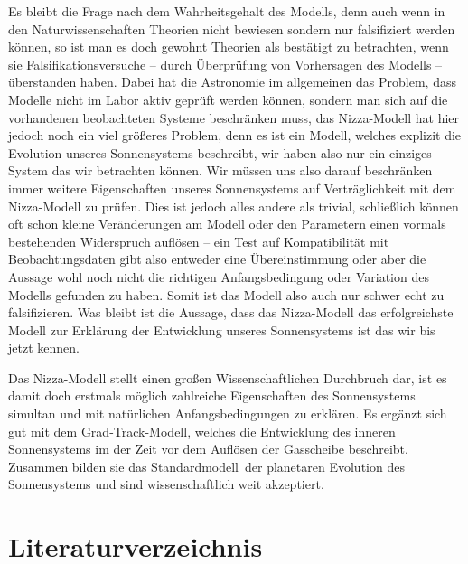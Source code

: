 \documentclass[12pt,a4paper,twoside]{article}
\renewcommand{\cite}{\citep}
\begin{document}
Es bleibt die Frage nach dem Wahrheitsgehalt des Modells, denn auch wenn in den Naturwissenschaften Theorien nicht bewiesen sondern nur falsifiziert werden können, so ist man es doch gewohnt Theorien als bestätigt zu betrachten, wenn sie Falsifikationsversuche -- durch Überprüfung von Vorhersagen des Modells -- überstanden haben.
Dabei hat die Astronomie im allgemeinen das Problem, dass Modelle nicht im Labor aktiv geprüft werden können, sondern man sich auf die vorhandenen beobachteten Systeme beschränken muss, das Nizza-Modell hat hier jedoch noch ein viel größeres Problem, denn es ist ein Modell, welches explizit die Evolution unseres Sonnensystems beschreibt, wir haben also nur ein einziges System das wir betrachten können.
Wir müssen uns also darauf beschränken immer weitere Eigenschaften unseres Sonnensystems auf Verträglichkeit mit dem Nizza-Modell zu prüfen.
Dies ist jedoch alles andere als trivial, schließlich können oft schon kleine Veränderungen am Modell oder den Parametern einen vormals bestehenden Widerspruch auflösen -- ein Test auf Kompatibilität mit Beobachtungsdaten gibt also entweder eine Übereinstimmung oder aber die Aussage wohl noch nicht die richtigen Anfangsbedingung oder Variation des Modells gefunden zu haben.
Somit ist das Modell also auch nur schwer echt zu falsifizieren. Was bleibt ist die Aussage, dass das Nizza-Modell das erfolgreichste Modell zur Erklärung der Entwicklung unseres Sonnensystems ist das wir bis jetzt kennen.

Das Nizza-Modell stellt einen großen Wissenschaftlichen Durchbruch dar, ist es damit doch erstmals möglich zahlreiche Eigenschaften des Sonnensystems simultan und mit natürlichen Anfangsbedingungen zu erklären. Es ergänzt sich gut mit dem Grad-Track-Modell\cite{Walsh2011}, welches die Entwicklung des inneren Sonnensystems im der Zeit vor dem Auflösen der Gasscheibe beschreibt. Zusammen bilden sie das \glqq Standardmodell\grqq\ der planetaren Evolution des Sonnensystems und sind wissenschaftlich weit akzeptiert.



\newpage

\section{Literaturverzeichnis}

{}
\end{document}
